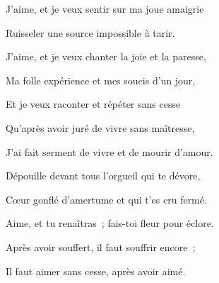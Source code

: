 {J'aime, et je veux sentir sur ma joue amaigrie

Ruisseler une source impossible à tarir.

J'aime, et je veux chanter la joie et la paresse,

Ma folle expérience et mes soucis d'un jour,

Et je veux raconter et répéter sans cesse

Qu'après avoir juré de vivre sans maîtresse,

J'ai fait serment de vivre et de mourir d'amour.

Dépouille devant tous l'orgueil qui te dévore,

Cœur gonflé d'amertume et qui t'es cru fermé.

Aime, et tu renaîtras~; fais-toi fleur pour éclore.

Après avoir souffert, il faut souffrir encore~;

Il faut aimer sans cesse, après avoir aimé.

\setlength{\parskip}{6pt}
}


